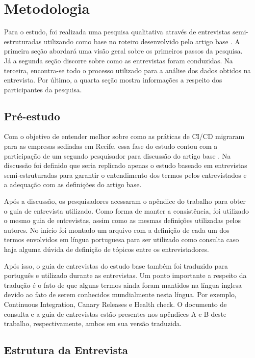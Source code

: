
\chapter{Metodologia}

Para o estudo, foi realizada uma pesquisa qualitativa através de entrevistas semi-estruturadas utilizando como base no roteiro desenvolvido pelo artigo base \cite{empiricalStudy2016}. A primeira seção abordará uma visão geral sobre os primeiros passos da pesquisa.  Já a segunda seção discorre sobre como as entrevistas foram conduzidas. Na terceira, encontra-se todo o processo utilizado para a análise dos dados obtidos na entrevista. Por último, a quarta seção mostra informações a respeito dos participantes da pesquisa.


\section{Pré-estudo}

Com o objetivo de entender melhor sobre como as práticas de CI/CD migraram para as empresas sediadas em Recife, essa fase do estudo contou com a participação de um segundo pesquisador para discussão do artigo base \cite{empiricalStudy2016}. Na discussão foi definido que seria replicado apenas o estudo baseado em entrevistas semi-estruturadas para garantir o entendimento dos termos pelos entrevistados e a adequação com as definições do artigo base. 

Após a discussão, os pesquisadores acessaram o apêndice do trabalho para obter o guia de entrevista utilizado. Como forma de manter a consistência, foi utilizado o mesmo guia de entrevistas, assim como as mesmas definições utilizadas pelos autores. No início foi montado um arquivo com a definição de cada um dos termos envolvidos em língua portuguesa para ser utilizado como consulta caso haja alguma dúvida de definição de tópicos entre os entrevistadores.

Após isso, o guia de entrevistas do estudo base também foi traduzido para português e utilizado durante as entrevistas. Um ponto importante a respeito da tradução é o fato de que alguns termos ainda foram mantidos na língua inglesa devido ao fato de serem conhecidos mundialmente nesta língua. Por exemplo, Continuous Integration, Canary Releases e Health check. O documento de consulta e a guia de entrevistas estão presentes nos apêndices A e B deste trabalho, respectivamente, ambos em sua versão traduzida.

\section{Estrutura da Entrevista}

